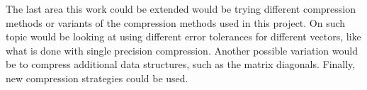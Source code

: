The last area this work could be extended would be trying different compression methods or variants of the compression methods used in this project.
On such topic would be looking at using different error tolerances for different vectors, like what is done with single precision compression.
Another possible variation would be to compress additional data structures, such as the matrix diagonals.
Finally, new compression strategies could be used.

